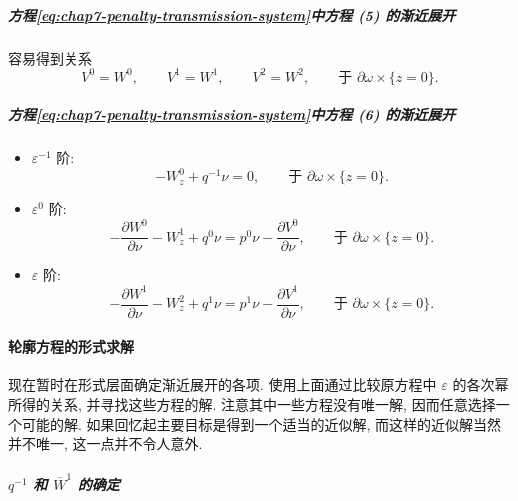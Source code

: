 \begin{sloppypar}
\subparagraph{方程\eqref{eq:chap7-penalty-transmission-system}中方程 (5) 的渐近展开}

容易得到关系
\begin{equation}
 V^0=W^0,\qquad V^1=W^1,\qquad V^2=W^2,
 \qquad\text{于 }\partial\omega\times\{z=0\}.
\label{eq:chap7-profile-value-transmission}
\end{equation}

\subparagraph{方程\eqref{eq:chap7-penalty-transmission-system}中方程 (6) 的渐近展开}

\begin{itemize}
\item $\varepsilon^{-1}$ 阶:
\begin{equation}
 -W^0_z+q^{-1}\nu=0,
 \qquad\text{于 }\partial\omega\times\{z=0\}.
\label{eq:chap7-profile-flux-order-minus-one}
\end{equation}

\item $\varepsilon^0$ 阶:
\begin{equation}
 -\frac{\partial W^0}{\partial\nu}-W^1_z+q^0\nu
 =p^0\nu-\frac{\partial V^0}{\partial\nu},
 \qquad\text{于 }\partial\omega\times\{z=0\}.
\label{eq:chap7-profile-flux-order-zero}
\end{equation}

\item $\varepsilon$ 阶:
\begin{equation}
 -\frac{\partial W^1}{\partial\nu}-W^2_z+q^1\nu
 =p^1\nu-\frac{\partial V^1}{\partial\nu},
 \qquad\text{于 }\partial\omega\times\{z=0\}.
\label{eq:chap7-profile-flux-order-one}
\end{equation}
\end{itemize}

\paragraph{轮廓方程的形式求解}
\label{subsubsec:chap7-formal-profile-resolution}

现在暂时在形式层面确定渐近展开的各项. 使用上面通过比较原方程中 $\varepsilon$ 的各次幂所得的关系, 并寻找这些方程的解. 注意其中一些方程没有唯一解, 因而任意选择一个可能的解. 如果回忆起主要目标是得到一个适当的近似解, 而这样的近似解当然并不唯一, 这一点并不令人意外.

\subparagraph{$q^{-1}$ 和 $\overline W^1$ 的确定}


\end{sloppypar}
